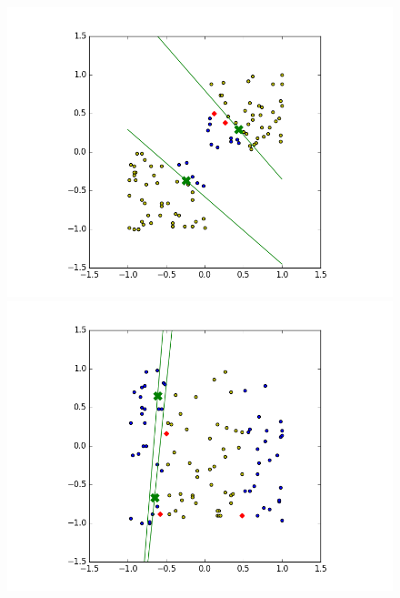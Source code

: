 \documentclass[notitlepage]{report}
\theoremstyle{definition}
\begin{document}
\begin{figure}[H]
  \centering
  \begin{minipage}[b]{0.4\textwidth}
    \includegraphics[width=\textwidth]{RBFN-BH-01.png}
    \caption{}
  \end{minipage}
  \hfill
  \centering
  \begin{minipage}[b]{0.4\textwidth}
    \includegraphics[width=\textwidth]{RBFN-BH-02.png}
    \caption{}
  \end{minipage}
  \hfill
  \centering
  \begin{minipage}[b]{0.4\textwidth}

\end{minipage}
\end{figure}
\end{document}
